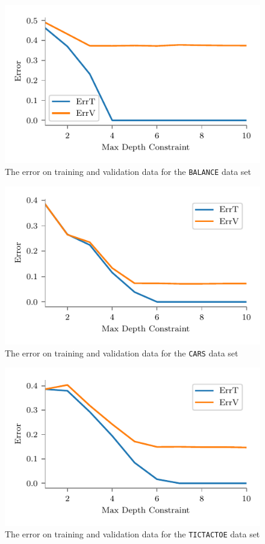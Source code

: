 \documentclass[screen, authorversion, nonacm, sigconf]{acmart}
\begin{document}
\begin{figure}
  \centering
  \includegraphics[width=\columnwidth]{figures/chart_errt_errv_balance_ours.pdf}
  \caption{The error on training and validation data for the \texttt{BALANCE} data set}
  \label{fig:mushroomserrterrv}
\end{figure}

\begin{figure}
  \centering
  \includegraphics[width=\columnwidth]{figures/chart_errt_errv_car_ours.pdf}
  \caption{The error on training and validation data for the \texttt{CARS} data set}
  \label{fig:mushroomserrterrv}
\end{figure}

\begin{figure}
  \centering
  \includegraphics[width=\columnwidth]{figures/chart_errt_errv_tictactoe_ours.pdf}
  \caption{The error on training and validation data for the \texttt{TICTACTOE} data set}
  \label{fig:mushroomserrterrv}
\end{figure}
\end{document}
